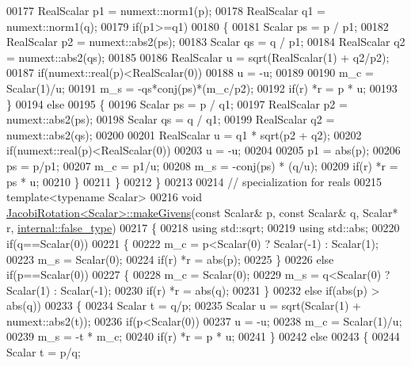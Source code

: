 \begin{DoxyCode}
00177     RealScalar p1 = numext::norm1(p);
00178     RealScalar q1 = numext::norm1(q);
00179     \textcolor{keywordflow}{if}(p1>=q1)
00180     \{
00181       Scalar ps = p / p1;
00182       RealScalar p2 = numext::abs2(ps);
00183       Scalar qs = q / p1;
00184       RealScalar q2 = numext::abs2(qs);
00185 
00186       RealScalar u = sqrt(RealScalar(1) + q2/p2);
00187       \textcolor{keywordflow}{if}(numext::real(p)<RealScalar(0))
00188         u = -u;
00189 
00190       m\_c = Scalar(1)/u;
00191       m\_s = -qs*conj(ps)*(m\_c/p2);
00192       \textcolor{keywordflow}{if}(r) *r = p * u;
00193     \}
00194     \textcolor{keywordflow}{else}
00195     \{
00196       Scalar ps = p / q1;
00197       RealScalar p2 = numext::abs2(ps);
00198       Scalar qs = q / q1;
00199       RealScalar q2 = numext::abs2(qs);
00200 
00201       RealScalar u = q1 * sqrt(p2 + q2);
00202       \textcolor{keywordflow}{if}(numext::real(p)<RealScalar(0))
00203         u = -u;
00204 
00205       p1 = abs(p);
00206       ps = p/p1;
00207       m\_c = p1/u;
00208       m\_s = -conj(ps) * (q/u);
00209       \textcolor{keywordflow}{if}(r) *r = ps * u;
00210     \}
00211   \}
00212 \}
00213 
00214 \textcolor{comment}{// specialization for reals}
00215 \textcolor{keyword}{template}<\textcolor{keyword}{typename} Scalar>
00216 \textcolor{keywordtype}{void} \hyperlink{group___jacobi___module_af73c81e9cc139b7e0d877ce553b02ec0}{JacobiRotation<Scalar>::makeGivens}(\textcolor{keyword}{const} Scalar& p, \textcolor{keyword}{const} Scalar& q,
       Scalar* r, \hyperlink{struct_eigen_1_1internal_1_1false__type}{internal::false\_type})
00217 \{
00218   \textcolor{keyword}{using} std::sqrt;
00219   \textcolor{keyword}{using} std::abs;
00220   \textcolor{keywordflow}{if}(q==Scalar(0))
00221   \{
00222     m\_c = p<Scalar(0) ? Scalar(-1) : Scalar(1);
00223     m\_s = Scalar(0);
00224     \textcolor{keywordflow}{if}(r) *r = abs(p);
00225   \}
00226   \textcolor{keywordflow}{else} \textcolor{keywordflow}{if}(p==Scalar(0))
00227   \{
00228     m\_c = Scalar(0);
00229     m\_s = q<Scalar(0) ? Scalar(1) : Scalar(-1);
00230     \textcolor{keywordflow}{if}(r) *r = abs(q);
00231   \}
00232   \textcolor{keywordflow}{else} \textcolor{keywordflow}{if}(abs(p) > abs(q))
00233   \{
00234     Scalar t = q/p;
00235     Scalar u = sqrt(Scalar(1) + numext::abs2(t));
00236     \textcolor{keywordflow}{if}(p<Scalar(0))
00237       u = -u;
00238     m\_c = Scalar(1)/u;
00239     m\_s = -t * m\_c;
00240     \textcolor{keywordflow}{if}(r) *r = p * u;
00241   \}
00242   \textcolor{keywordflow}{else}
00243   \{
00244     Scalar t = p/q;

\end{DoxyCode}
